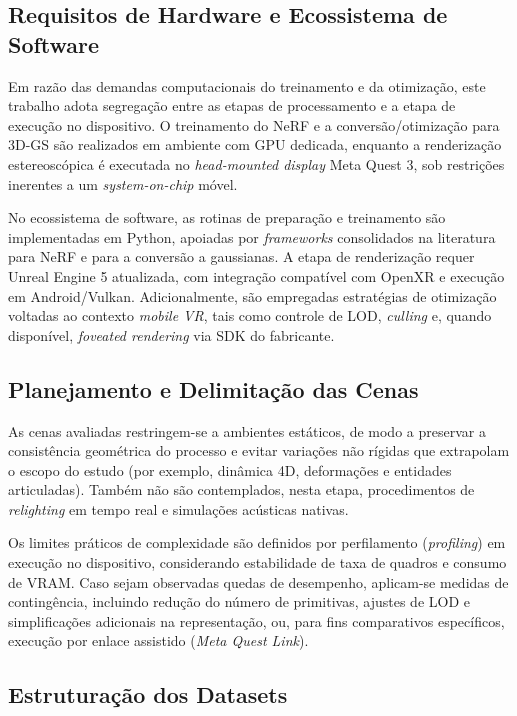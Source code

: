 \subsection{Requisitos de Hardware e Ecossistema de Software}

Em razão das demandas computacionais do treinamento e da otimização, este trabalho adota segregação entre as etapas de processamento e a etapa de execução no dispositivo. O treinamento do NeRF e a conversão/otimização para 3D-GS são realizados em ambiente com GPU dedicada, enquanto a renderização estereoscópica é executada no \textit{head-mounted display} Meta Quest 3, sob restrições inerentes a um \textit{system-on-chip} móvel.

No ecossistema de software, as rotinas de preparação e treinamento são implementadas em Python, apoiadas por \textit{frameworks} consolidados na literatura para NeRF e para a conversão a gaussianas. A etapa de renderização requer Unreal Engine 5 atualizada, com integração compatível com OpenXR e execução em Android/Vulkan. Adicionalmente, são empregadas estratégias de otimização voltadas ao contexto \textit{mobile VR}, tais como controle de LOD, \textit{culling} e, quando disponível, \textit{foveated rendering} via SDK do fabricante.

\subsection{Planejamento e Delimitação das Cenas}

As cenas avaliadas restringem-se a ambientes estáticos, de modo a preservar a consistência geométrica do processo e evitar variações não rígidas que extrapolam o escopo do estudo (por exemplo, dinâmica 4D, deformações e entidades articuladas). Também não são contemplados, nesta etapa, procedimentos de \textit{relighting} em tempo real e simulações acústicas nativas.

Os limites práticos de complexidade são definidos por perfilamento (\textit{profiling}) em execução no dispositivo, considerando estabilidade de taxa de quadros e consumo de VRAM. Caso sejam observadas quedas de desempenho, aplicam-se medidas de contingência, incluindo redução do número de primitivas, ajustes de LOD e simplificações adicionais na representação, ou, para fins comparativos específicos, execução por enlace assistido (\textit{Meta Quest Link}).
\subsection{Estruturação dos Datasets}

